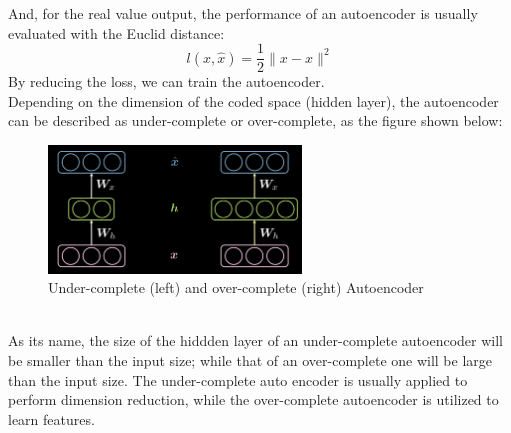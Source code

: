 And, for the real value output, the performance of an autoencoder is usually evaluated with the Euclid distance:
$$ l(x,\hat{x}) = \frac{1}{2} \| x-\hat{x} \|^2 $$
By reducing the loss, we can train the autoencoder.
\\
Depending on the dimension of the coded space (hidden layer), the autoencoder can be described as under-complete or over-complete, as the figure shown below:
\\
\begin{figure}[htb]
    \centering
    \includegraphics[width=0.6\textwidth]{labs/09/images/Under_(over)_complete_Autoencoder.png}
    \caption{Under-complete (left) and over-complete (right) Autoencoder}
    \label{fig:Under_(over)_complete_Autoencoder}
\end{figure}
\\
As its name, the size of the hiddden layer of an under-complete autoencoder will be smaller than the input size; while that of an over-complete one will be large than the input size. The under-complete auto encoder is usually applied to perform dimension reduction, while the over-complete autoencoder is utilized to learn features.
\\
